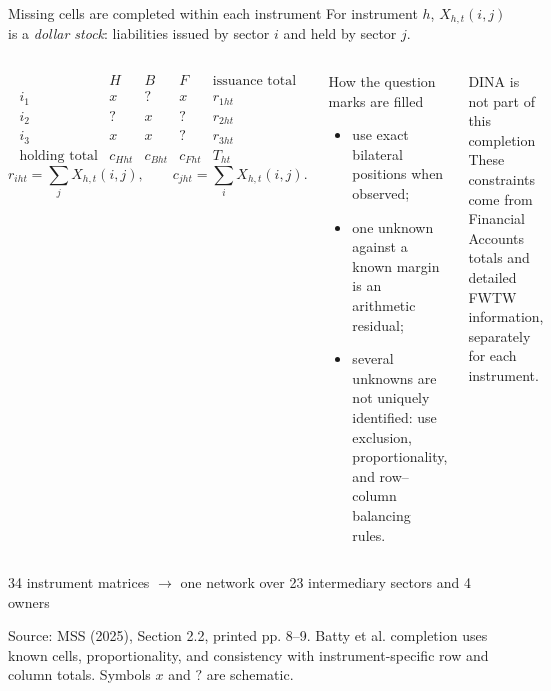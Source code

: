 \documentclass[aspectratio=169,11pt]{beamer}
\newcommand{\source}[1]{%
  \vfill
  {\color{MSSGray}\fontsize{6.5}{7.5}\selectfont #1\par}
}
\newcommand{\orange}[1]{\textcolor{MSSOrange}{#1}}
\newcommand{\navy}[1]{\textcolor{MSSNavy}{#1}}
\begin{document}
\begin{frame}{Missing cells are completed within each instrument}
  \fontsize{8.9}{10.6}\selectfont
  For instrument \(h\), \(X_{h,t}(i,j)\) is a \emph{dollar stock}: liabilities
  issued by sector \(i\) and held by sector \(j\).
  \begin{columns}[T,onlytextwidth]
    \[
      \begin{array}{c|ccc|c}
        & H & B & F & \text{issuance total}\\ \hline
        i_1 & x & ? & x & r_{1ht}\\
        i_2 & ? & x & ? & r_{2ht}\\
        i_3 & x & x & ? & r_{3ht}\\ \hline
        \text{holding total} & c_{Hht} & c_{Bht} & c_{Fht} & T_{ht}
      \end{array}
    \]
    \[
      r_{iht}=\sum_jX_{h,t}(i,j),\qquad
      c_{jht}=\sum_iX_{h,t}(i,j).
    \]

    \begin{block}{How the question marks are filled}
      \begin{itemize}
        \item use exact bilateral positions when observed;
        \item one unknown against a known margin is an arithmetic residual;
        \item several unknowns are not uniquely identified: use exclusion,
          proportionality, and row--column balancing rules.
      \end{itemize}
    \end{block}
    \begin{alertblock}{DINA is not part of this completion}
      These constraints come from Financial Accounts totals and detailed FWTW
      information, separately for each instrument.
    \end{alertblock}
  \end{columns}
  \vspace{0.05cm}
  \centering
  \orange{34 instrument matrices} \(\longrightarrow\) \navy{one network over 23 intermediary sectors and 4 owners}
  \source{Source: MSS (2025), Section 2.2, printed pp. 8--9. Batty et al. completion uses known cells, proportionality, and consistency with instrument-specific row and column totals. Symbols \(x\) and \(?\) are schematic.}
\end{frame}
\end{document}
